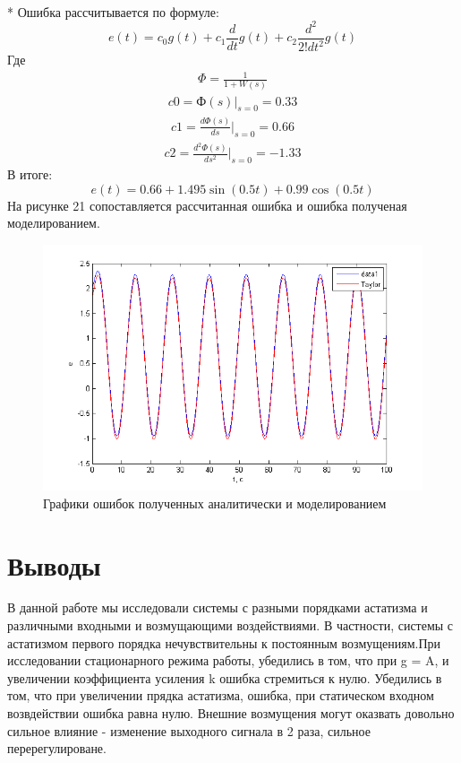 \documentclass[a4paper, 12pt]{article}
\begin{document}
\hfill\\*
Ошибка рассчитывается по формуле:
\begin{equation}
e(t)=c_0g(t)+c_1\frac{d}{dt}g(t)+c_2\frac{d^2}{2!dt^2}g(t)
\end{equation}
Где \\
	
\begin{align}
\Phi=\frac{1}{1+W(s)}
\end{align}
\begin{align}
c0=Ф(s)|_{s=0}=0.33
\end{align}
\begin{align}
c1=\frac{d\Phi(s)}{ds} |_{s=0}=0.66
\end{align}
\begin{align}
c2=\frac{d^2\Phi(s)}{ds^2} |_{s=0}=-1.33 
\end{align}
В итоге:
\begin{equation}
 e(t)=0.66+1.495\sin(0.5t)+0.99\cos(0.5t)
 \end{equation}
\newline
На рисунке 21 сопоставляется рассчитанная ошибка и ошибка полученая моделированием.
\begin{figure}[h!]
	\centering
	\includegraphics[width = 1\textwidth]{hinh14}
	\caption{Графики ошибок полученных аналитически и моделированием} 
\end{figure}

\newpage

	\section*{\centering Выводы}
 В данной работе мы исследовали системы с разными порядками астатизма и различными входными и возмущающими воздействиями. В частности, системы с астатизмом первого порядка нечувствительны к постоянным возмущениям.При исследовании стационарного режима работы, убедились в том, что при g = A, и увеличении коэффициента усиления k ошибка стремиться к нулю. 
 Убедились в том, что при увеличении прядка астатизма, ошибка, при статическом входном возвдействии ошибка равна нулю.
 Внешние возмущения могут оказвать довольно сильное влияние - изменение выходного сигнала в 2 раза, сильное перерегулироване.
\end{document}
